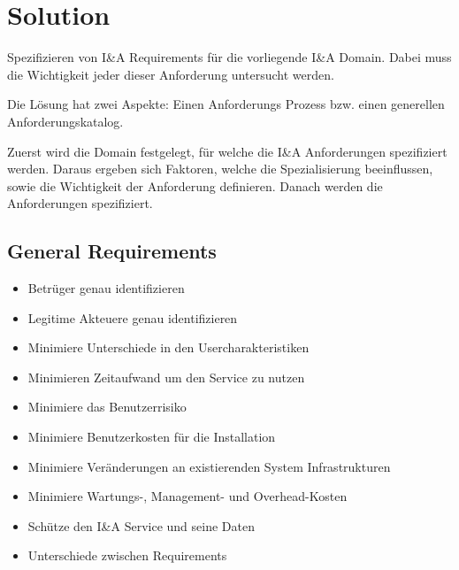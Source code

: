 \section{Solution}
Spezifizieren von I\&A Requirements für die vorliegende I\&A Domain. Dabei muss die Wichtigkeit jeder dieser Anforderung untersucht werden.

Die Lösung hat zwei Aspekte: Einen Anforderungs Prozess bzw. einen generellen Anforderungskatalog.

Zuerst wird die Domain festgelegt, für welche die I\&A Anforderungen spezifiziert werden. Daraus ergeben sich Faktoren, welche die Spezialisierung beeinflussen, sowie die Wichtigkeit der Anforderung definieren. Danach werden die Anforderungen spezifiziert.

\subsection{General Requirements}
\begin{itemize}
  \item Betrüger genau identifizieren
  \item Legitime Akteuere genau identifizieren
  \item Minimiere Unterschiede in den Usercharakteristiken
  \item Minimieren Zeitaufwand um den Service zu nutzen
  \item Minimiere das Benutzerrisiko
  \item Minimiere Benutzerkosten für die Installation
  \item Minimiere Veränderungen an existierenden System Infrastrukturen
  \item Minimiere Wartungs-, Management- und Overhead-Kosten
  \item Schütze den I\&A Service und seine Daten
  \item Unterschiede zwischen Requirements
\end{itemize}

